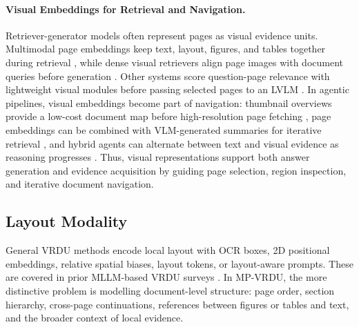 \documentclass[11pt]{article}
\begin{document}
\paragraph{Visual Embeddings for Retrieval and Navigation.}
Retriever-generator models often represent pages as visual evidence units. Multimodal page embeddings keep text, layout, figures, and tables together during retrieval \cite{cho2024m3docrag}, while dense visual retrievers align page images with document queries before generation \cite{tanaka2025vdocrag}. Other systems score question-page relevance with lightweight visual modules before passing selected pages to an LVLM \cite{li2025avir, kang2024multi}. In agentic pipelines, visual embeddings become part of navigation: thumbnail overviews provide a low-cost document map before high-resolution page fetching \cite{zheng2026doc}, page embeddings can be combined with VLM-generated summaries for iterative retrieval \cite{jain2025simpledoc}, and hybrid agents can alternate between text and visual evidence as reasoning progresses \cite{wang2025vidorag}. Thus, visual representations support both answer generation and evidence acquisition by guiding page selection, region inspection, and iterative document navigation.

\subsection{Layout Modality}
General VRDU methods encode local layout with OCR boxes, 2D positional embeddings, relative spatial biases, layout tokens, or layout-aware prompts. These are covered in prior MLLM-based VRDU surveys \cite{ding2025survey}. In MP-VRDU, the more distinctive problem is modelling document-level structure: page order, section hierarchy, cross-page continuations, references between figures or tables and text, and the broader context of local evidence.

\end{document}
